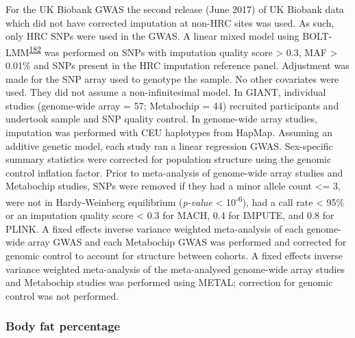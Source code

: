 \documentclass[11pt,twoside]{bristolthesis}
\begin{document}
For the UK Biobank GWAS the second release (June 2017) of UK Biobank data which did not have corrected imputation at non-HRC sites was used. As such, only HRC SNPs were used in the GWAS. A linear mixed model using BOLT-LMM\textsuperscript{\protect\hyperlink{ref-Loh2015}{182}} was performed on SNPs with imputation quality score \textgreater{} 0.3, MAF \textgreater{} 0.01\% and SNPs present in the HRC imputation reference panel. Adjustment was made for the SNP array used to genotype the sample. No other covariates were used. They did not assume a non-infinitesimal model. In GIANT, individual studies (genome-wide array = 57; Metabochip = 44) recruited participants and undertook sample and SNP quality control. In genome-wide array studies, imputation was performed with CEU haplotypes from HapMap. Assuming an additive genetic model, each study ran a linear regression GWAS. Sex-specific summary statistics were corrected for population structure using the genomic control inflation factor. Prior to meta-analysis of genome-wide array studies and Metabochip studies, SNPs were removed if they had a minor allele count \textless{}= 3, were not in Hardy-Weinberg equilibrium (\emph{p-value} \textless{} 10\textsuperscript{-6}), had a call rate \textless{} 95\% or an imputation quality score \textless{} 0.3 for MACH, 0.4 for IMPUTE, and 0.8 for PLINK. A fixed effects inverse variance weighted meta-analysis of each genome-wide array GWAS and each Metabochip GWAS was performed and corrected for genomic control to account for structure between cohorts. A fixed effects inverse variance weighted meta-analysis of the meta-analysed genome-wide array studies and Metabochip studies was performed using METAL; correction for genomic control was not performed.

\hypertarget{body-fat-percentage}{%
\subsubsection{Body fat percentage}\label{body-fat-percentage}}
\end{document}

